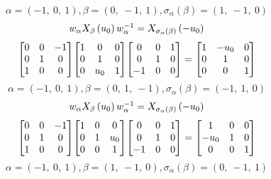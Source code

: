 \documentclass[11pt]{article}
\theoremstyle{definition}
\begin{document}
\[
\alpha = \left( -1, \  0, \  1\right), \beta = \left( 0, \  -1, \  1\right), \sigma_{\alpha}(\beta) = \left( 1, \  -1, \  0\right)
\]
\[
\scaletoalign{\textwidth}{w_{\alpha} X_{\beta}\left(u_{0}\right) w_{\alpha}^{-1} = X_{\sigma_{\alpha}\left(\beta\right)}\left(- u_{0}\right)}
\]
\[
\scaletoalign{\textwidth}{{\left[\begin{matrix}0 & 0 & -1\\0 & 1 & 0\\1 & 0 & 0\end{matrix}\right]} {\left[\begin{matrix}1 & 0 & 0\\0 & 1 & 0\\0 & u_{0} & 1\end{matrix}\right]} {\left[\begin{matrix}0 & 0 & 1\\0 & 1 & 0\\-1 & 0 & 0\end{matrix}\right]} = {\left[\begin{matrix}1 & - u_{0} & 0\\0 & 1 & 0\\0 & 0 & 1\end{matrix}\right]}}
\]
\[
\alpha = \left( -1, \  0, \  1\right), \beta = \left( 0, \  1, \  -1\right), \sigma_{\alpha}(\beta) = \left( -1, \  1, \  0\right)
\]
\[
\scaletoalign{\textwidth}{w_{\alpha} X_{\beta}\left(u_{0}\right) w_{\alpha}^{-1} = X_{\sigma_{\alpha}\left(\beta\right)}\left(- u_{0}\right)}
\]
\[
\scaletoalign{\textwidth}{{\left[\begin{matrix}0 & 0 & -1\\0 & 1 & 0\\1 & 0 & 0\end{matrix}\right]} {\left[\begin{matrix}1 & 0 & 0\\0 & 1 & u_{0}\\0 & 0 & 1\end{matrix}\right]} {\left[\begin{matrix}0 & 0 & 1\\0 & 1 & 0\\-1 & 0 & 0\end{matrix}\right]} = {\left[\begin{matrix}1 & 0 & 0\\- u_{0} & 1 & 0\\0 & 0 & 1\end{matrix}\right]}}
\]
\[
\alpha = \left( -1, \  0, \  1\right), \beta = \left( 1, \  -1, \  0\right), \sigma_{\alpha}(\beta) = \left( 0, \  -1, \  1\right)
\]
\end{document}
